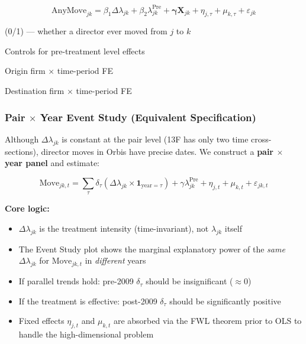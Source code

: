\documentclass[11pt,a4paper]{article}
\begin{document}
\begin{equation}\label{eq:pair_cross}
\text{AnyMove}_{jk} = \beta_1 \Delta\lambda_{jk} + \beta_2 \lambda_{jk}^{\text{Pre}} + \boldsymbol{\gamma} \mathbf{X}_{jk} + \eta_{j,\tau} + \mu_{k,\tau} + \varepsilon_{jk}
\end{equation}

\begin{description}[leftmargin=*]
  \item[AnyMove\(_{jk}\)] (0/1) — whether a director ever moved from \(j\) to \(k\)
  \item[\(\lambda_{jk}^{\text{Pre}}\)] Controls for pre-treatment level effects
  \item[\(\eta_{j,\tau}\)] Origin firm \(\times\) time-period FE
  \item[\(\mu_{k,\tau}\)] Destination firm \(\times\) time-period FE
\end{description}

\subsubsection*{Pair \(\times\) Year Event Study (Equivalent Specification)}\label{sec:eventstudy}

Although \(\Delta\lambda_{jk}\) is constant at the pair level (13F has only two time cross-sections), director moves in Orbis have precise dates. We construct a {\bf pair \(\times\) year panel} and estimate:

\begin{equation}\label{eq:pair_event}
\text{Move}_{jk,t} = \sum_{\tau} \delta_\tau (\Delta\lambda_{jk} \times \mathbf{1}_{\text{year}=\tau}) + \gamma \lambda_{jk}^{\text{Pre}} + \eta_{j,t} + \mu_{k,t} + \varepsilon_{jk,t}
\end{equation}

{\bf Core logic:}

\begin{itemize}
  \item \(\Delta\lambda_{jk}\) is the treatment intensity (time-invariant), not \(\lambda_{jk}\) itself
  \item The Event Study plot shows the marginal explanatory power of the {\em same} \(\Delta\lambda_{jk}\) for \(\text{Move}_{jk,t}\) in {\em different} years
  \item If parallel trends hold: pre-2009 \(\delta_\tau\) should be insignificant (\(\approx 0\))
  \item If the treatment is effective: post-2009 \(\delta_\tau\) should be significantly positive
  \item Fixed effects \(\eta_{j,t}\) and \(\mu_{k,t}\) are absorbed via the FWL theorem prior to OLS to handle the high-dimensional problem
\end{itemize}
\end{document}
